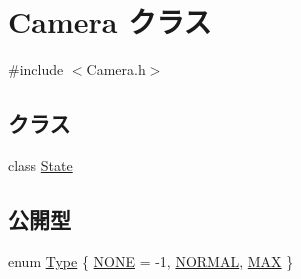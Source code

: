 \hypertarget{class_camera}{}\section{Camera クラス}
\label{class_camera}


{\ttfamily \#include $<$Camera.\+h$>$}

\subsection*{クラス}
\begin{DoxyCompactItemize}
\item 
class \mbox{\hyperlink{class_camera_1_1_state}{State}}
\end{DoxyCompactItemize}
\subsection*{公開型}
\begin{DoxyCompactItemize}
\item 
enum \mbox{\hyperlink{class_camera_a3b0a1f58deca679ac665f61c480d1dcb}{Type}} \{ \mbox{\hyperlink{class_camera_a3b0a1f58deca679ac665f61c480d1dcba12c79dd5dae61a931ff74c2855ec82f5}{N\+O\+NE}} = -\/1, 
\mbox{\hyperlink{class_camera_a3b0a1f58deca679ac665f61c480d1dcbab0634eb8efa2896a2771ea868cbc241a}{N\+O\+R\+M\+AL}}, 
\mbox{\hyperlink{class_camera_a3b0a1f58deca679ac665f61c480d1dcba7a6334fc8418deee4c453e1c7a366efa}{M\+AX}}
 \}
\end{DoxyCompactItemize}

